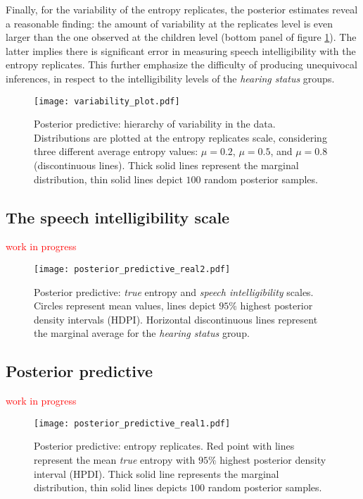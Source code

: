 Finally, for the variability of the entropy replicates, the posterior estimates reveal a reasonable finding: the amount of variability at the replicates level is even larger than the one observed at the children level (bottom panel of figure \ref{fig:variability}). The latter implies there is significant error in measuring speech intelligibility with the entropy replicates. This further emphasize the difficulty of producing unequivocal  inferences, in respect to the intelligibility levels of the \textit{hearing status} groups.
%
\begin{figure}[!h]
	\centering
	\texttt{[image: variability\_plot.pdf]}
	\caption[Posterior predictive: hierarchy of variability in the data]{Posterior predictive: hierarchy of variability in the data. Distributions are plotted at the entropy replicates scale, considering three different average entropy values: $\mu=0.2$, $\mu=0.5$, and $\mu=0.8$ (discontinuous lines). Thick solid lines represent the marginal distribution, thin solid lines depict $100$ random posterior samples.}
	\label{fig:variability}
\end{figure}
%
%
\subsection{The speech intelligibility scale} \label{sS:results_scales}
%
\textcolor{red}{work in progress}
%
\begin{figure}[!h]
	\centering
	\texttt{[image: posterior\_predictive\_real2.pdf]}
	\caption[Posterior predictive: \textit{true} entropy and \textit{speech intelligibility} scales]{Posterior predictive: \textit{true} entropy and \textit{speech intelligibility} scales. Circles represent mean values, lines depict $95\%$ highest posterior density intervals (HDPI). Horizontal discontinuous lines represent the marginal average for the \textit{hearing status} group.}
	\label{fig:predictive2}
\end{figure}
%
%
\subsection{Posterior predictive} \label{sS:results_posterior}
%
\textcolor{red}{work in progress}
%
\begin{figure}[!h]
	\centering
	\texttt{[image: posterior\_predictive\_real1.pdf]}
	\caption[Posterior predictive: entropy replicates]{Posterior predictive: entropy replicates. Red point with lines represent the mean \textit{true} entropy with $95\%$ highest posterior density interval (HPDI). Thick solid line represents the marginal distribution, thin solid lines depicts $100$ random posterior samples.}
	\label{fig:predictive1}
\end{figure}
%
%
